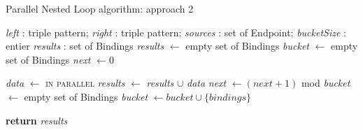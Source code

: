 \begin{algorithm}[t]
    \caption{Parallel Nested Loop algorithm: approach 2}\label{algo:pnl}
    \begin{algorithmic}[1]
        \Require \textit{left} : triple pattern; \textit{right} : triple pattern; \textit{sources} : set of Endpoint; \textit{bucketSize} : entier
        \Ensure \textit{results} : set of Bindings
            \State \textit{results} $\gets$ empty set of Bindings
            \State \textit{bucket} $\gets$ empty set of Bindings
            \State \textit{next} $\gets 0$

             
                    \State \textit{data} $\gets$  \textsc{in parallel}
                    \State \textit{results} $\gets$ \textit{results} $\cup$ \textit{data}
                    \State \textit{next} $\gets (\textit{next} + 1)$ mod 
                    \State \textit{bucket} $\gets$ empty set of Bindings
                \EndIf
                \State \textit{bucket} $\gets \textit{bucket} \cup \{ \textit{bindings} \}$
            \EndFor

            \State \textbf{return} \textit{results}
        \EndFunction
    \end{algorithmic}
\end{algorithm}
